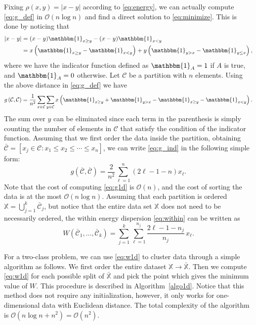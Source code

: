 \documentclass[aps,preprint,nofootinbib,floatfix]{revtex4-1}
\newcommand\C{{\mathcal{C}}}
\newcommand\OO{{\mathcal{O}}}
\newcommand{\Ind}[1]{\mathbbm{1}_{#1}}
\begin{document}
Fixing
$\rho(x,y) = |x - y|$ according to \eqref{eq:energy}, we can actually compute 
\eqref{eq:g_def} in $\OO(n \log n)$ and find
a direct solution to \eqref{eq:minimize}. 
This is done by noticing that
\begin{equation}
\begin{aligned}
|x - y|  &= (x-y)\Ind{x \ge y} -
(x-y) \Ind{x < y}  \\
&= 
x \left( \Ind{x \ge y} - \Ind{x < y} \right)  + 
y \left( \Ind{y > x} - \Ind{y \le x} \right)  ,
\end{aligned}
\end{equation}
where we have the indicator function defined as
$\Ind{A}=1$ if $A$ is true, and $\Ind{A}=0$ otherwise. 
Let $\C$ be a partition with
$n$ elements. Using the above distance in \eqref{eq:g_def} we have
\begin{equation}
\label{eq:g_ind}
g\left(\C,\C\right) = \dfrac{1}{n^2} \sum_{x \in \C} 
\sum_{y \in \C} 
x \left(
\Ind{x \ge y} + \Ind{y > x} - 
\Ind{x \ge y}-\Ind{x < y} \right) .
\end{equation}
The sum over $y$ can be eliminated since each term in
the parenthesis is simply counting the number of elements in $\C$ that satisfy
the condition of the indicator function. Assuming
that we first order the data inside the partition, obtaining
$\bar{\C} = [ x_j \in \C: x_1 \le x_2 \le \dotsm \le x_{n}]$, we
can write \eqref{eq:g_ind} in the following simple form:
\begin{equation}
\label{eq:g1d}
g\left(\bar{\C}, \bar{\C}\right) = 
\dfrac{2}{n^2} \sum_{\ell=1}^n (2\ell - 1 - n) x_\ell .
\end{equation}
Note that the cost of computing 
\eqref{eq:g1d}
is $\OO(n)$, and the cost of
sorting the data
is at the most $\OO(n\log n)$.
Assuming that each partition is ordered  $\mathbb{X} = \bigcup_{j=1}^k
\bar{\C}_j$, but notice that the entire data set $\mathbb{X}$ does not 
need to be necessarily ordered, the within energy dispersion
\eqref{eq:within} can be written as
\begin{equation}
\label{eq:w1d}
W\left( \bar{\C}_1,\dotsc,\bar{\C}_k \right) = 
\sum_{j=1}^k \sum_{\ell=1}^{n_j} \dfrac{2\ell - 1 - n_j}{n_j} \, x_\ell.
\end{equation}

For a two-class problem, we can use \eqref{eq:w1d} to cluster data
through a simple algorithm 
as follows. We first order
the entire dataset $\mathbb{X} \to \bar{\mathbb{X}}$. Then 
we compute \eqref{eq:w1d} for each possible split of $\bar{\mathbb{X}}$
and pick the point which gives the minimum value of $W$. 
This procedure is described in Algorithm~\ref{algo1d}. 
Notice that
this method does not require any initialization,
however,
it only works for one-dimensional data with Euclidean distance. The total
complexity of the algorithm is $\OO(n\log n + n^2) = \OO(n^2)$.
\end{document}
